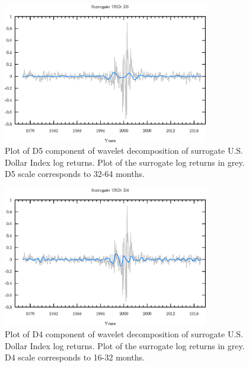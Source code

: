 \begin{figure}
\begin{center}
\includegraphics[width=0.8\textwidth]{./code/plot/surrogate_usd_wr_D5.eps}
\caption{Plot of D5 component of wavelet decomposition of surrogate U.S. Dollar Index log returns. 
	Plot of the surrogate log returns in grey. D5 scale corresponds to 32-64 months.}
\end{center}
\label{fig:s-usd-wr-d5}
\end{figure}

\begin{figure}
\begin{center}
\includegraphics[width=0.8\textwidth]{./code/plot/surrogate_usd_wr_D4.eps}
\caption{Plot of D4 component of wavelet decomposition of surrogate U.S. Dollar Index log returns. 
	Plot of the surrogate log returns in grey. D4 scale corresponds to 16-32 months.}
\end{center}
\label{fig:s-usd-wr-d4}
\end{figure}

